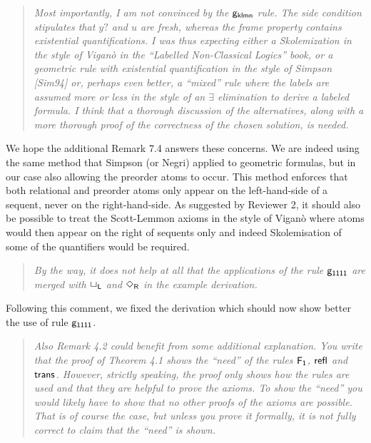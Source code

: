 \documentclass[10pt]{article}
\begin{document}
\begin{quote}\it
Most importantly, I am not convinced by the ${\mathsf{g_{klmn}}}$ rule. The side
condition stipulates that $y?$ and $u$ are fresh, whereas the frame
property contains existential quantifications. I was thus expecting
either a Skolemization in the style of Vigan\`o in the ``Labelled
Non-Classical Logics'' book, or a geometric rule with existential
quantification in the style of Simpson [Sim94] or, perhaps even
better, a ``mixed'' rule where the labels are assumed more or less in
the style of an $\exists$ elimination to derive a labeled formula.  I
think that a thorough discussion of the alternatives, along with a
more thorough proof of the correctness of the chosen solution, is
needed.
\end{quote}

We hope the additional Remark 7.4 answers these concerns. 
We are indeed using the same method that Simpson (or Negri) applied to 
geometric formulas, but in our case also allowing the preorder atoms to occur. 
This method enforces that both relational and preorder atoms only appear on 
the left-hand-side of a sequent, never on the right-hand-side. 
As suggested by Reviewer 2, it should also be possible to treat the Scott-Lemmon axioms in 
the style of Vigan\`o where atoms would then appear on the right of sequents 
only and indeed Skolemisation of some of the quantifiers would be required.

\begin{quote}\it
By the way, it does not help at all that the applications of the
rule $\mathsf{g_{1111}}$ are merged with $\mathsf{\mathord{\Box}}_{\mathsf{L}}$ and $\mathsf{\mathord{\Diamond}}_{\mathsf{R}}$ in the example
derivation.
\end{quote}

Following this comment, we fixed the derivation which should now 
show better the use of rule $\mathsf{g_{1111}}$.

\begin {quote}\it
Also Remark 4.2 could benefit from some additional explanation. You
write that the proof of Theorem 4.1 shows the ``need'' of the rules
$\mathsf{F_1}$, $\mathsf{refl}$ and $\mathsf{trans}$. However, strictly speaking, the proof only
shows how the rules are used and that they are helpful to prove the
axioms. To show the ``need'' you would likely have to show that no
other proofs of the axioms are possible. That is of course the
case, but unless you prove it formally, it is not fully correct to
claim that the ``need'' is shown. 
\end{quote}
\end{document}

